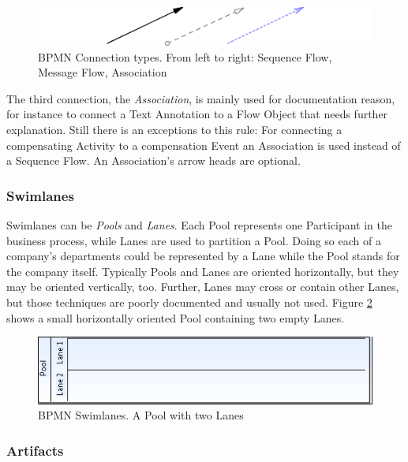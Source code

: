 \begin{figure}[htp]
	\centering
	\includegraphics[width=.75\textwidth]{figures/bpmn/connections.png}
	\caption[BPMN Connection types]{BPMN Connection types. From left to right: Sequence Flow, Message Flow, Association}
	\label{fig:connections}
\end{figure}

The third connection, the \emph{Association}, is mainly used for documentation reason, for instance to connect a Text Annotation to a Flow Object that needs further explanation. Still there is an exceptions to this rule: For connecting a compensating Activity to a compensation Event an Association is used instead of a Sequence Flow. An Association's arrow heads are optional.

\subsubsection*{Swimlanes}

Swimlanes can be \emph{Pools} and \emph{Lanes}. Each Pool represents one Participant in the business process, while Lanes are used to partition a Pool. Doing so each of a company's departments could be represented by a Lane while the Pool stands for the company itself. Typically Pools and Lanes are oriented horizontally, but they may be oriented vertically, too. Further, Lanes may cross or contain other Lanes, but those techniques are poorly documented and usually not used. Figure \ref{fig:swimlanes} shows a small horizontally oriented Pool containing two empty Lanes.

\begin{figure}[htp]
	\centering
	\includegraphics[width=.75\textwidth]{figures/bpmn/swimlanes.png}
	\caption[BPMN Swimlanes]{BPMN Swimlanes. A Pool with two Lanes}
	\label{fig:swimlanes}
\end{figure}

\subsubsection*{Artifacts}

